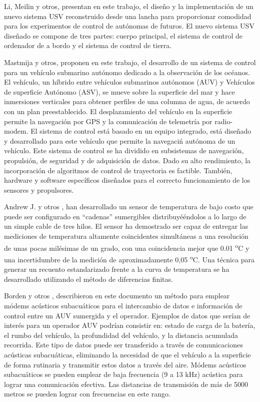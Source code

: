 Li, Meilin y otros\cite{li2012design}, presentan en este trabajo, el dise\~no y la implementaci\'on de un nuevo sistema USV reconstruido desde una lancha para proporcionar comodidad para los experimentos de control de aut\'onomas de futuros. El nuevo sistema USV dise\~nado se compone de tres partes: cuerpo principal, el sistema de control de ordenador de a bordo y el sistema de control de tierra. 

 Mastmija y otros\cite{masmitja2010development}, proponen en este trabajo, el desarrollo de un sistema de control para un veh\'iculo submarino autónomo dedicado a la observaci\'on de los oc\'eanos. El veh\'iculo, un h\'ibrido entre veh\'iculos submarinos aut\'onomos (AUV) y Veh\'iculos de superficie Aut\'onomo (ASV), se mueve sobre la superficie del mar y hace inmersiones verticales para obtener perfiles de una columna de agua, de acuerdo con un plan preestablecido. El desplazamiento del veh\'iculo en la superficie permite la navegaci\'on por GPS y la comunicaci\'on de telemetr\'ia por radio-modem. El sistema de control est\'a basado en un equipo integrado, est\'a dise\~nado y desarrollado para este veh\'iculo que permite la navegaci\'n aut\'onoma de un veh\'iculo. Este sistema de control se ha dividido en subsistemas de navegaci\'on, propulsi\'on, de seguridad y de adquisici\'on de datos. Dado su alto rendimiento, la incorporaci\'on de algoritmos de control de trayectoria es factible. Tambi\'en, hardware y software espec\'ificos dise\~nados para el correcto funcionamiento de los sensores y propulsores.

Andrew J. y otros \cite{skinner2006using}, han desarrollado un sensor de temperatura de bajo costo que puede ser configurado en “cadenas” sumergibles distribuyé\'endolos a lo largo de un simple cable de tres hilos. El sensor ha demostrado ser capaz de entregar las mediciones de temperatura altamente coincidentes simult\'aneas a una resoluci\'on de unas pocas mil\'esimas de un grado, con una coincidencia mejor que 0.01  \textsuperscript{o}C y una incertidumbre de la medici\'on de aproximadamente 0,05  \textsuperscript{o}C. Una t\'ecnica para generar un recuento estandarizado frente a la curva de temperatura se ha desarrollado utilizando el m\'etodo de diferencias finitas.

Borden  y otros \cite{borden2012long},  describieron en este documento un m\'etodo para emplear m\'odems ac\'usticos subacu\'aticos para el intercambio de datos e informaci\'on  de control entre un AUV sumergida y el operador. Ejemplos de datos que ser\'ian de  inter\'es para un operador AUV podr\'ian consistir en: estado de carga de la bater\'ia, el rumbo del veh\'iculo, la profundidad del veh\'iculo, y la distancia acumulada recorrida. Este  tipo de datos puede ser transferido a través de comunicaciones acústicas subacu\'aticas, eliminando la  necesidad de que el veh\'iculo a la superficie de forma rutinaria y transmitir estos datos a trav\'es del aire. M\'odems ac\'usticos subacuáticos se pueden emplear de baja frecuencia (9 a 13 kHz) ac\'ustica para lograr  una comunicación efectiva. Las distancias de transmisi\'on de m\'as de 5000 metros se  pueden lograr con frecuencias en este rango.

